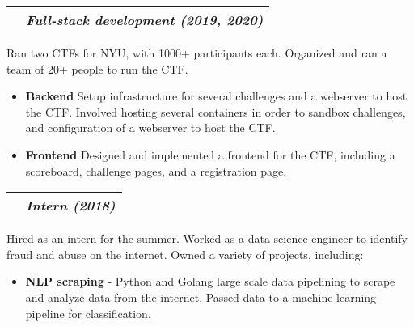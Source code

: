 \documentclass[letterpaper,10pt]{article}
\makeatletter
\newcommand{\sectiontitle}[2]{%
  \begin{tabularx}{\linewidth}{@{} X c @{}}
    {\sffamily\textbf{#1}} & {\rmfamily\textit{#2}} \\ \hline
  \end{tabularx}%
  \vspace{3pt}%
}
\newcommand{\inlineimg}[2][width=0.4cm]{%
  \begin{adjustbox}{raise=-0.2\height}%
    \texttt{[image: \#2]}%
  \end{adjustbox}%
}
\makeatother
\begin{document}
\begin{minipage}[t]{\firstcolwidth}
  \vspace{3pt}
  \sectiontitle{\inlineimg[width=11pt]{assets/csaw.jpeg} CSAW CTF Lead}{Full-stack development (2019, 2020)}
  Ran two CTFs for NYU, with 1000+ participants each. Organized and ran a team of 20+ people to run the CTF.
  \begin{itemize}[leftmargin=*,itemsep=2pt,topsep=0pt]
    \item \textbf{Backend} Setup infrastructure for several challenges and a webserver to host the CTF. Involved hosting several containers in order to sandbox challenges, and configuration of a webserver to host the CTF.
    \item \textbf{Frontend} Designed and implemented a frontend for the CTF, including a scoreboard, challenge pages, and a registration page.
  \end{itemize}

  \vspace{3pt}
  \sectiontitle{\inlineimg{assets/cisco.png} Cisco Umbrella [OpenDNS]}{Intern (2018)}
  Hired as an intern for the summer. Worked as a data science engineer to identify fraud and abuse on the internet. Owned a variety of projects, including:
  \begin{itemize}[leftmargin=*,noitemsep,topsep=0pt]
    \item \textbf{NLP scraping} - Python and Golang large scale data pipelining to scrape and analyze data from the internet. Passed data to a machine learning pipeline for classification.
  \end{itemize}
\end{minipage}\hspace{\columnsep}
%
\end{document}
